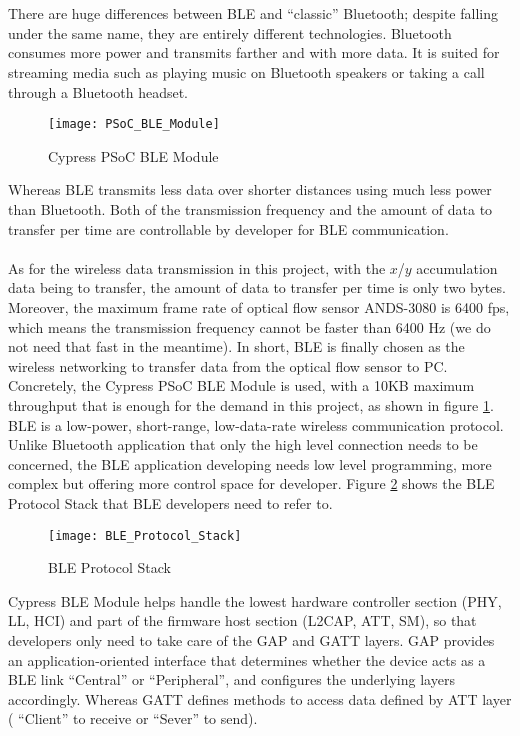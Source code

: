 \\\\%
There are huge differences between BLE and \enquote{classic} Bluetooth; despite falling under the same name, they are entirely different technologies. Bluetooth consumes more power and transmits farther and with more data. It is suited for streaming media such as playing music on Bluetooth speakers or taking a call through a Bluetooth headset.
%
\begin{figure}[H]
\centering
\texttt{[image: PSoC\_BLE\_Module]}
\caption{Cypress PSoC BLE Module}
\label{PSoC_BLE_Module}
\end{figure}%
%
Whereas BLE transmits less data over shorter distances using much less power than Bluetooth. Both of the transmission frequency and the amount of data to transfer per time are controllable by developer for BLE communication.
\\\\
%
As for the wireless data transmission in this project, with the \(x\)/\(y\) accumulation data being to transfer, the amount of data to transfer per time is only two bytes. Moreover, the maximum frame rate of optical flow sensor ANDS-3080 is 6400 fps, which means the transmission frequency cannot be faster than 6400 Hz (we do not need that fast in the meantime). In short, BLE is finally chosen as the wireless networking to transfer data from the optical flow sensor to PC. Concretely, the Cypress PSoC BLE Module is used, with a 10KB maximum throughput that is enough for the demand in this project, as shown in figure \ref{PSoC_BLE_Module}.
%
%
BLE is a low-power, short-range, low-data-rate wireless communication protocol. Unlike Bluetooth application that only the high level connection needs to be concerned, the BLE application developing needs low level programming, more complex but offering more control space for developer. Figure \ref{BLE_Protocol_Stack} shows the BLE Protocol Stack that BLE developers need to refer to.
%
\begin{figure}[H]
\centering
\texttt{[image: BLE\_Protocol\_Stack]}
\caption{BLE Protocol Stack \cite{Cypress15}}
\label{BLE_Protocol_Stack}
\end{figure}%
%
Cypress BLE Module helps handle the lowest hardware controller section (PHY, LL, HCI) and part of the firmware host section (L2CAP, ATT, SM), so that developers only need to take care of the GAP and GATT layers. GAP provides an application-oriented interface that determines whether the device acts as a BLE link \enquote{Central} or \enquote{Peripheral}, and configures the underlying layers accordingly. Whereas GATT defines methods to access data defined by ATT layer ( \enquote{Client} to receive or \enquote{Sever} to send).
